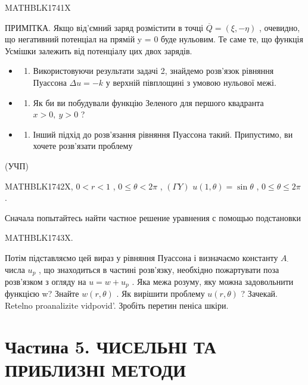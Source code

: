 \documentclass[
  ukrainian,
]{article}
\providecommand{\tightlist}{%
  \setlength{\itemsep}{0pt}\setlength{\parskip}{0pt}}
\begin{document}
MATHBLK1741X

ПРИМІТКА. Якщо від'ємний заряд розмістити в точці
\(\overline{Q} = (\xi, -\eta)\) , очевидно, що негативний потенціал на
прямій y = 0 буде нульовим. Те саме те, що функція Усмішки залежить від
потенціалу цих двох зарядів.

\begin{itemize}
\tightlist
\item
  \begin{enumerate}
  \def\labelenumi{\arabic{enumi}.}
  \setcounter{enumi}{2}
  \tightlist
  \item
    Використовуючи результати задачі 2, знайдемо розв'язок рівняння
    Пуассона \(\Delta u = -k\) у верхній півплощині з умовою нульової
    межі.
  \end{enumerate}
\item
  \begin{enumerate}
  \def\labelenumi{\arabic{enumi}.}
  \setcounter{enumi}{3}
  \tightlist
  \item
    Як би ви побудували функцію Зеленого для першого квадранта
    \(x>0,\ y>0\) ?
  \end{enumerate}
\item
  \begin{enumerate}
  \def\labelenumi{\arabic{enumi}.}
  \setcounter{enumi}{4}
  \tightlist
  \item
    Інший підхід до розв'язання рівняння Пуассона такий. Припустимо, ви
    хочете розв'язати проблему
  \end{enumerate}
\end{itemize}

(УЧП)

MATHBLK1742X, \(0 < r < 1\) , \(0 \le \theta < 2\pi\) , \((\Gamma Y)\)
\(u(1, \theta) = \sin \theta\) , \(0 \le \theta \le 2\pi\) .

Сначала попытайтесь найти частное решение уравнения с помощью
подстановки

MATHBLK1743X.

Потім підставляємо цей вираз у рівняння Пуассона і визначаємо константу
\(A_{\cdot}\) числа \(u_p\) , що знаходиться в частині розв'язку,
необхідно пожартувати поза розв'язком з огляду на \(u=w+u_p\) . Яка межа
розуму, яку можна задовольнити функцією w? Знайте \(w(r, \theta)\) . Як
вирішити проблему \(u(r, \theta)\) ? Зачекай. Retelno proanalizite
vidpovid'. Зробіть перетин пеніса шкіри.

\section{Частина 5. ЧИСЕЛЬНІ ТА ПРИБЛИЗНІ
МЕТОДИ}\label{ux447ux430ux441ux442ux438ux43dux430-5.-ux447ux438ux441ux435ux43bux44cux43dux456-ux442ux430-ux43fux440ux438ux431ux43bux438ux437ux43dux456-ux43cux435ux442ux43eux434ux438}
\end{document}
